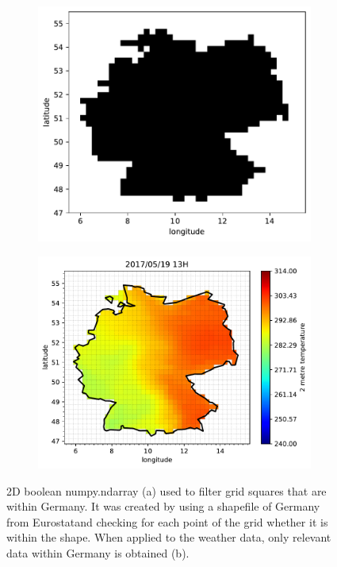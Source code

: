 \begin{figure}[h!]%
	\centering
	\begin{subfigure}{.5\textwidth}
		\centering
		\includegraphics[width=.85\textwidth]{plots/isinDE}%
		\caption{}
		\label{fig:isinDE}%
	\end{subfigure}%
	\begin{subfigure}{.5\textwidth}
		\centering
		\includegraphics[width=.95\textwidth]{plots/t2m/maxvar/0_map_isin}%
		\caption{}
		\label{fig:t2m_maxvar_0_map_isin}%
	\end{subfigure}
	\caption[2D boolean numpy.ndarray (a) used to filter grid squares within Germany. It was created by using a shapefile of Germany from Eurostat and checking for each point of the grid if it is within the shapefile. When applied to the weather data, only relevant data within Germany is obtained (b).]{2D boolean numpy.ndarray (a) used to filter grid squares that are within Germany. It was created by using a shapefile of Germany from Eurostat\footnotemark and checking for each point of the grid whether it is within the shape. When applied to the weather data, only relevant data within Germany is obtained (b).}
	\label{fig:isin_compare}
\end{figure}

